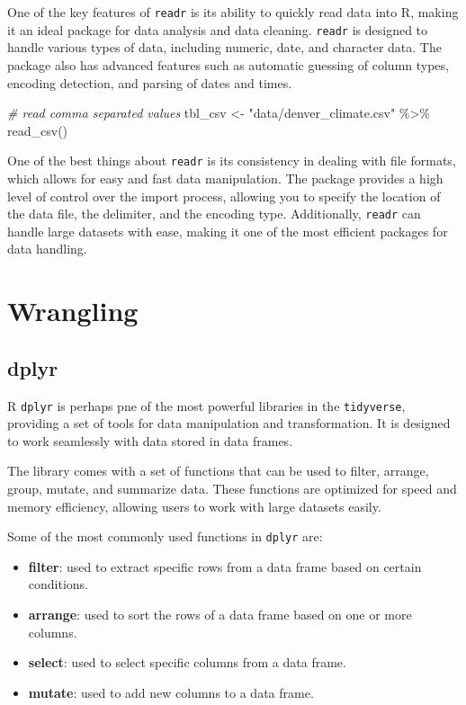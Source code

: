 \documentclass[
]{book}
\newenvironment{Shaded}{\begin{snugshade}}{\end{snugshade}}
\newcommand{\CommentTok}[1]{\textcolor[rgb]{0.56,0.35,0.01}{\textit{#1}}}
\newcommand{\FunctionTok}[1]{\textcolor[rgb]{0.00,0.00,0.00}{#1}}
\newcommand{\NormalTok}[1]{#1}
\newcommand{\OtherTok}[1]{\textcolor[rgb]{0.56,0.35,0.01}{#1}}
\newcommand{\SpecialCharTok}[1]{\textcolor[rgb]{0.00,0.00,0.00}{#1}}
\newcommand{\StringTok}[1]{\textcolor[rgb]{0.31,0.60,0.02}{#1}}
\providecommand{\tightlist}{%
  \setlength{\itemsep}{0pt}\setlength{\parskip}{0pt}}
\begin{document}
One of the key features of \texttt{readr} is its ability to quickly read data into R, making it an ideal package for data analysis and data cleaning. \texttt{readr} is designed to handle various types of data, including numeric, date, and character data. The package also has advanced features such as automatic guessing of column types, encoding detection, and parsing of dates and times.

\begin{Shaded}
\begin{Highlighting}[]
\CommentTok{\# read comma separated values}
\NormalTok{tbl\_csv }\OtherTok{\textless{}{-}} \StringTok{"data/denver\_climate.csv"} \SpecialCharTok{\%\textgreater{}\%} \FunctionTok{read\_csv}\NormalTok{()}
\end{Highlighting}
\end{Shaded}

One of the best things about \texttt{readr} is its consistency in dealing with file formats, which allows for easy and fast data manipulation. The package provides a high level of control over the import process, allowing you to specify the location of the data file, the delimiter, and the encoding type. Additionally, \texttt{readr} can handle large datasets with ease, making it one of the most efficient packages for data handling.

\hypertarget{wrangling}{%
\section{Wrangling}\label{wrangling}}

\hypertarget{dplyr}{%
\subsection*{dplyr}\label{dplyr}}

R \texttt{dplyr} is perhaps pne of the most powerful libraries in the \texttt{tidyverse}, providing a set of tools for data manipulation and transformation. It is designed to work seamlessly with data stored in data frames.

The library comes with a set of functions that can be used to filter, arrange, group, mutate, and summarize data. These functions are optimized for speed and memory efficiency, allowing users to work with large datasets easily.

Some of the most commonly used functions in \texttt{dplyr} are:

\begin{itemize}
\tightlist
\item
  \textbf{filter}: used to extract specific rows from a data frame based on certain conditions.
\item
  \textbf{arrange}: used to sort the rows of a data frame based on one or more columns.
\item
  \textbf{select}: used to select specific columns from a data frame.
\item
  \textbf{mutate}: used to add new columns to a data frame.
\end{itemize}
\end{document}
